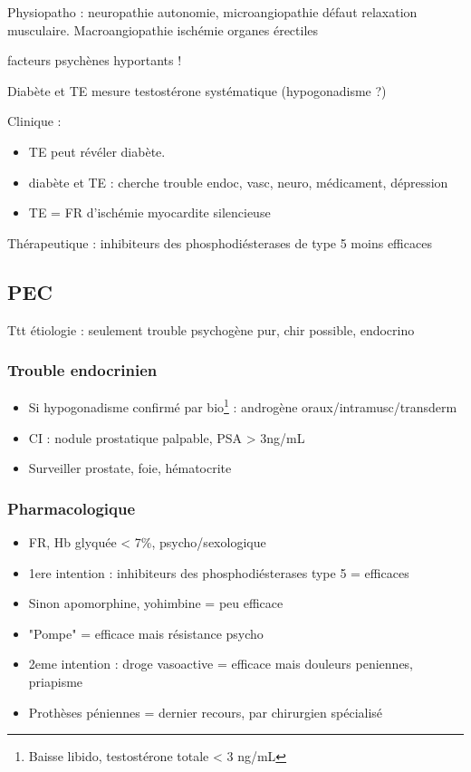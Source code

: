 \documentclass[11pt]{article}
\begin{document}
Physiopatho : neuropathie autonomie, microangiopathie \thus défaut relaxation
musculaire. Macroangiopathie \thus ischémie organes érectiles

\danger facteurs psychènes hyportants !

Diabète et TE \thus mesure testostérone systématique (hypogonadisme ?)

Clinique : 
\begin{itemize}
\item TE peut révéler diabète.
\item diabète et TE : cherche trouble endoc, vasc, neuro, médicament, dépression
\item TE = FR d'ischémie myocardite silencieuse \danger
\end{itemize}

Thérapeutique : inhibiteurs des phosphodiésterases de type 5 moins efficaces

\subsection{PEC}
\label{sec:org71bf241}
Ttt étiologie : seulement trouble psychogène pur, chir possible, endocrino

\subsubsection{Trouble endocrinien}
\label{sec:orgb6d2ae5}
\begin{itemize}
\item Si hypogonadisme confirmé par bio\footnote{Baisse libido, testostérone totale < 3 ng/mL} : androgène oraux/intramusc/transderm
\item CI : nodule prostatique palpable, PSA > 3ng/mL
\item Surveiller prostate, foie, hématocrite
\end{itemize}

\subsubsection{Pharmacologique}
\label{sec:orge685e4c}
\begin{itemize}
\item FR, Hb glyquée < 7\%, psycho/sexologique
\item 1ere intention : inhibiteurs des phosphodiésterases type 5 = efficaces
\item Sinon apomorphine, yohimbine = peu efficace
\item "Pompe" = efficace mais résistance psycho
\item 2eme intention : droge vasoactive = efficace mais douleurs peniennes, priapisme
\item Prothèses péniennes = dernier recours, par chirurgien spécialisé
\end{itemize}
\end{document}
